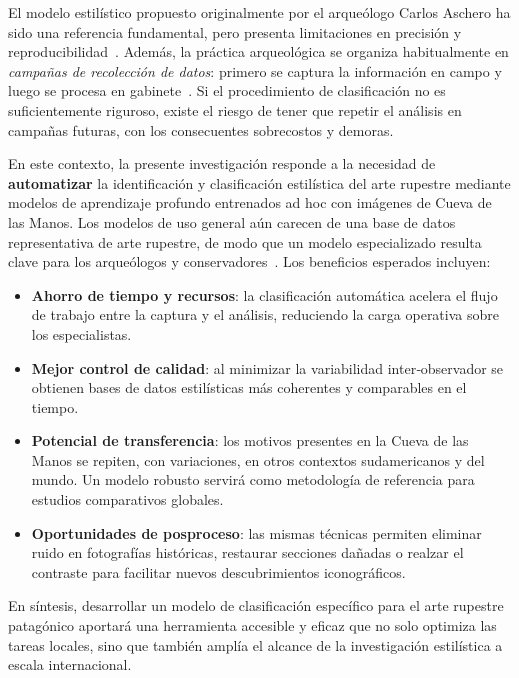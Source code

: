 El modelo estilístico propuesto originalmente por el arqueólogo Carlos Aschero ha sido una referencia fundamental, pero presenta limitaciones en precisión y reproducibilidad~\cite{aschero2000}.
Además, la práctica arqueológica se organiza habitualmente en \emph{campañas de recolección de datos}: primero se captura la información en campo y luego se procesa en gabinete~\cite{aschero1998}.
Si el procedimiento de clasificación no es suficientemente riguroso, existe el riesgo de tener que repetir el análisis en campañas futuras, con los consecuentes sobrecostos y demoras.

En este contexto, la presente investigación responde a la necesidad de \textbf{automatizar} la identificación y clasificación estilística del arte rupestre mediante modelos de aprendizaje profundo entrenados ad hoc con imágenes de Cueva de las Manos.
Los modelos de uso general aún carecen de una base de datos representativa de arte rupestre, de modo que un modelo especializado resulta clave para los arqueólogos y conservadores~\cite{aschero2018}.
Los beneficios esperados incluyen:

\begin{itemize}
  \item \textbf{Ahorro de tiempo y recursos}: la clasificación automática acelera el flujo de trabajo entre la captura y el análisis, reduciendo la carga operativa sobre los especialistas.
  \item \textbf{Mejor control de calidad}: al minimizar la variabilidad inter‐observador se obtienen bases de datos estilísticas más coherentes y comparables en el tiempo.
  \item \textbf{Potencial de transferencia}: los motivos presentes en la Cueva de las Manos se repiten, con variaciones, en otros contextos sudamericanos y del mundo.  Un modelo robusto servirá como metodología de referencia para estudios comparativos globales.
  \item \textbf{Oportunidades de posproceso}: las mismas técnicas permiten eliminar ruido en fotografías históricas, restaurar secciones dañadas o realzar el contraste para facilitar nuevos descubrimientos iconográficos.
\end{itemize}

En síntesis, desarrollar un modelo de clasificación específico para el arte rupestre patagónico aportará una herramienta accesible y eficaz que no solo optimiza las tareas locales, sino que también amplía el alcance de la investigación estilística a escala internacional.

